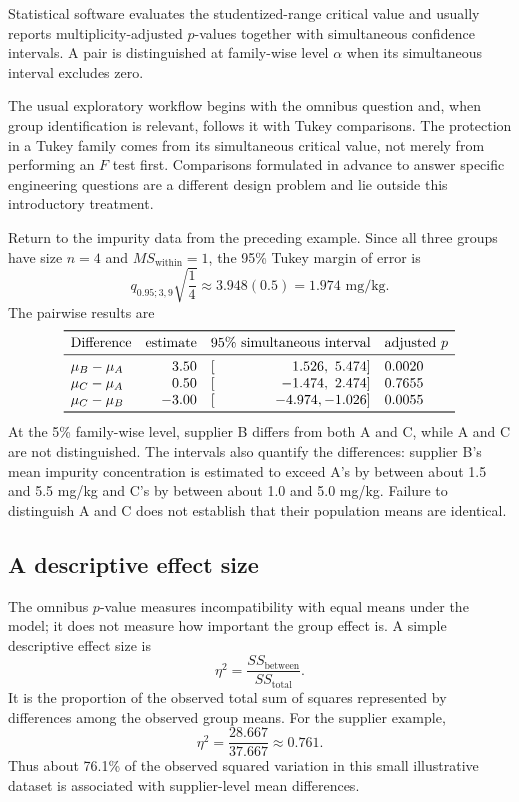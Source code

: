 Statistical software evaluates the studentized-range critical value and usually reports multiplicity-adjusted $p$-values together with simultaneous confidence intervals. A pair is distinguished at family-wise level $\alpha$ when its simultaneous interval excludes zero.

The usual exploratory workflow begins with the omnibus question and, when group identification is relevant, follows it with Tukey comparisons. The protection in a Tukey family comes from its simultaneous critical value, not merely from performing an $F$ test first. Comparisons formulated in advance to answer specific engineering questions are a different design problem and lie outside this introductory treatment.

\begin{example}\par
Return to the impurity data from the preceding example. Since all three groups have size $n=4$ and $MS_{\text{within}}=1$, the 95\% Tukey margin of error is
\[
q_{0.95;3,9}\sqrt{\frac{1}{4}}
\approx3.948(0.5)
=1.974\text{ mg/kg}.
\]
The pairwise results are
\[
\begin{array}{lrrrl}
\toprule
\text{Difference} & \text{estimate} & \multicolumn{2}{c}{\text{95\% simultaneous interval}} & \text{adjusted }p\\
\midrule
\mu_B-\mu_A &  3.50 & [ &  1.526,\ 5.474] & 0.0020\\
\mu_C-\mu_A &  0.50 & [ & -1.474,\ 2.474] & 0.7655\\
\mu_C-\mu_B & -3.00 & [ & -4.974,-1.026] & 0.0055\\
\bottomrule
\end{array}
\]
At the 5\% family-wise level, supplier B differs from both A and C, while A and C are not distinguished. The intervals also quantify the differences: supplier B's mean impurity concentration is estimated to exceed A's by between about 1.5 and 5.5 mg/kg and C's by between about 1.0 and 5.0 mg/kg. Failure to distinguish A and C does not establish that their population means are identical.
\end{example}

\subsection{A descriptive effect size}

The omnibus $p$-value measures incompatibility with equal means under the model; it does not measure how important the group effect is. A simple descriptive effect size is
\[
\eta^2
=\frac{SS_{\text{between}}}{SS_{\text{total}}}.
\]
It is the proportion of the observed total sum of squares represented by differences among the observed group means. For the supplier example,
\[
\eta^2
=\frac{28.667}{37.667}
\approx0.761.
\]
Thus about 76.1\% of the observed squared variation in this small illustrative dataset is associated with supplier-level mean differences.

